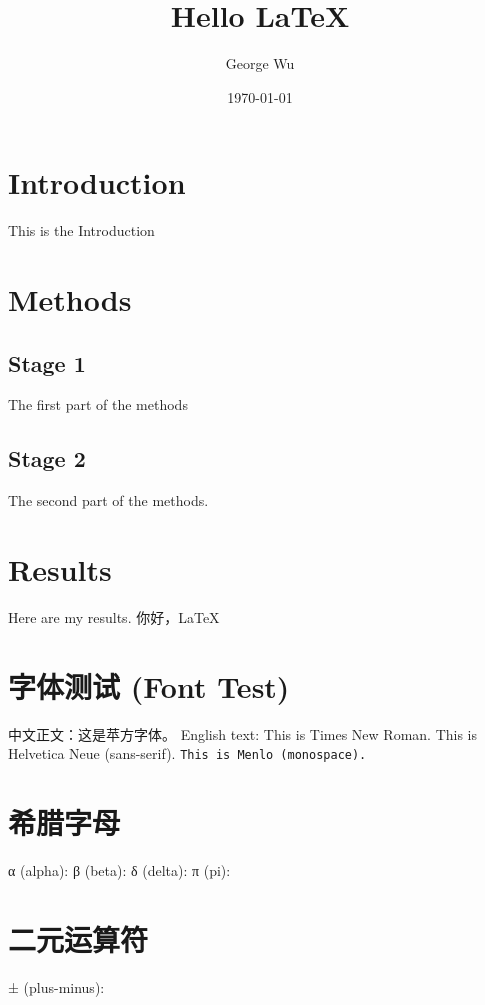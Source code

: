 \documentclass[a4paper,12pt]{article}
\begin{document}
    \title{Hello LaTeX}
    \author{George Wu}
    \date{\today}
    \maketitle



    \section{Introduction}
    This is the Introduction


    \section{Methods}

    \subsection{Stage 1}
    The first part of the methods

    \subsection{Stage 2}
    The second part of the methods.


    \section{Results}
    Here are my results.
    你好，\LaTeX

    \section*{字体测试 (Font Test)}
    中文正文：这是苹方字体。
    English text: This is Times New Roman.
    \textsf{This is Helvetica Neue (sans-serif).}
    \texttt{This is Menlo (monospace).}

    \section*{希腊字母}
    α (alpha):\alpha
    β (beta):\beta
    δ (delta):\delta
    π (pi): \pi

    \section*{二元运算符}
    ± (plus-minus):\pm
\end{document}
